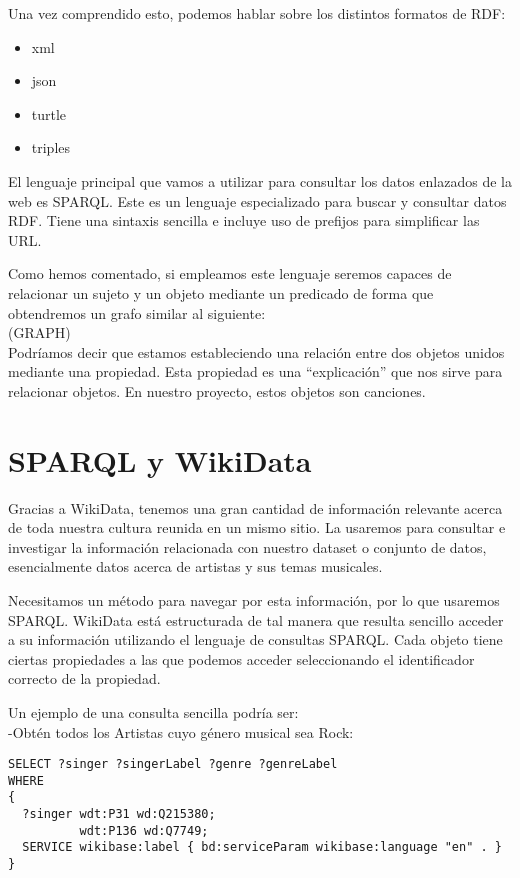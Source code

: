Una vez comprendido esto, podemos hablar sobre los distintos formatos de RDF:
\begin{itemize}
\item xml
\item json
\item turtle
\item triples
\end{itemize}

El lenguaje principal que vamos a utilizar para consultar los datos enlazados de la web es SPARQL. Este es un lenguaje especializado para buscar y consultar datos RDF. Tiene una sintaxis sencilla e incluye uso de prefijos para simplificar las URL.

Como hemos comentado, si empleamos este lenguaje seremos capaces de relacionar un sujeto y un objeto mediante un predicado de forma que obtendremos un grafo similar al siguiente:\\

(GRAPH)\\

Podríamos decir que estamos estableciendo una relación entre dos objetos unidos mediante una propiedad. Esta propiedad es una ``explicación'' que nos sirve para relacionar objetos. En nuestro proyecto, estos objetos son canciones.


\section{SPARQL y WikiData}

Gracias a WikiData, tenemos una gran cantidad de información relevante acerca de toda nuestra cultura reunida en un mismo sitio. La usaremos para consultar e investigar la información relacionada con nuestro dataset o conjunto de datos, esencialmente datos acerca de artistas y sus temas musicales.

Necesitamos un método para navegar por esta información, por lo que usaremos SPARQL. WikiData está estructurada de tal manera que resulta sencillo acceder a su información utilizando el lenguaje de consultas SPARQL. Cada objeto tiene ciertas propiedades a las que podemos acceder seleccionando el identificador correcto de la propiedad.

Un ejemplo de una consulta sencilla podría ser:\\

-Obtén todos los Artistas cuyo género musical sea Rock:\\

\begin{lstlisting}[language=SPARQL]
SELECT ?singer ?singerLabel ?genre ?genreLabel
WHERE
{
  ?singer wdt:P31 wd:Q215380;
      	  wdt:P136 wd:Q7749;
  SERVICE wikibase:label { bd:serviceParam wikibase:language "en" . }
}
\end{lstlisting}

